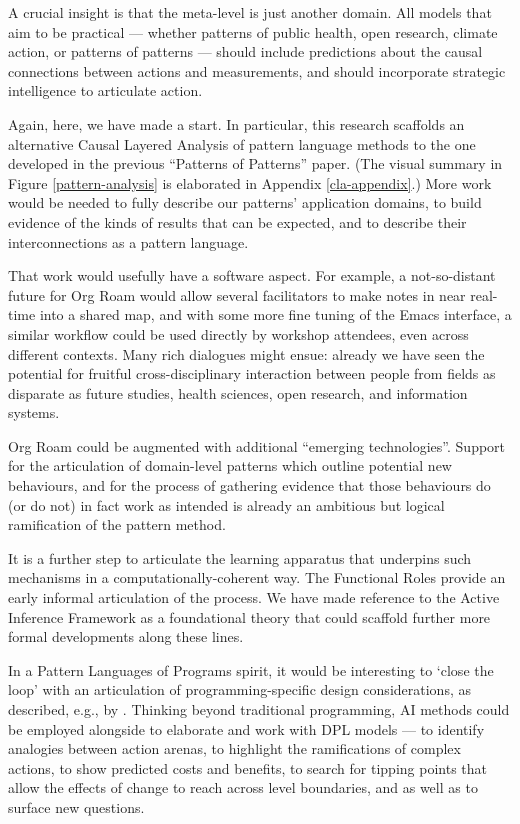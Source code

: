 \documentclass[acmlarge,timestamp]{acmart}
\begin{document}
A crucial insight is that the meta-level is just another domain.  All
models that aim to be practical — whether patterns of public health,
open research, climate action, or patterns of patterns — should
include predictions about the causal connections between actions and
measurements, and should incorporate strategic intelligence to
articulate action.

Again, here, we have made a start.  In particular, this research
scaffolds an alternative Causal Layered Analysis of pattern language
methods to the one developed in the previous “Patterns of Patterns”
paper.  (The visual summary in Figure \ref{pattern-analysis} is
elaborated in Appendix \ref{cla-appendix}.)  More work would be needed
to fully describe our patterns’ application domains, to build evidence
of the kinds of results that can be expected, and to describe their
interconnections as a pattern language.

That work would usefully have a software aspect.  For example, a
not-so-distant future for Org Roam would allow several facilitators to
make notes in near real-time into a shared map, and with some more
fine tuning of the Emacs interface, a similar workflow could be used
directly by workshop attendees, even across different contexts.  Many
rich dialogues might ensue: already we have seen the potential for
fruitful cross-disciplinary interaction between people from fields as
disparate as future studies, health sciences, open research, and
information systems.

Org Roam could be augmented with additional “emerging technologies”.
Support for the articulation of domain-level patterns which outline
potential new behaviours, and for the process of gathering evidence
that those behaviours do (or do not) in fact work as intended is
already an ambitious but logical ramification of the pattern method.

It is a further step to articulate the learning apparatus that
underpins such mechanisms in a computationally-coherent way.  The {\sc
  Functional Roles} provide an early informal articulation of the
process.  We have made reference to the Active Inference Framework as
a foundational theory that could scaffold further more formal
developments along these lines.



In a Pattern Languages of Programs spirit, it would be interesting to
‘close the loop’ with an articulation of programming-specific design
considerations, as described, e.g., by \citet{felleisen2018design}.
Thinking beyond traditional programming, AI methods could be employed
alongside to elaborate and work with DPL models — to identify
analogies between action arenas, to highlight the ramifications of
complex actions, to show predicted costs and benefits, to search for
tipping points that allow the effects of change to reach across level
boundaries, and as well as to surface new questions.
\end{document}
